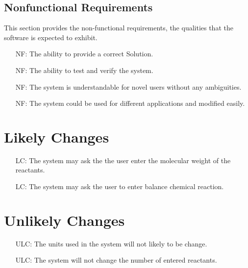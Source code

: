 \documentclass[12pt]{article}
\newcounter{reqnum} %
\newcounter{nfreqnum} %
\newcounter{lcnum} %
\newcounter{ulcnum} %
\begin{document}
\subsection{Nonfunctional Requirements}

This section provides the non-functional requirements, the qualities that the software is
expected to exhibit.\\

\noindent \begin{itemize}
\item[NF\refstepcounter{nfreqnum}\thenfreqnum \label{Accuracy}:] The ability to provide a correct Solution.\\
\item[NF\refstepcounter{nfreqnum}\thenfreqnum \label{Verify}:]  The ability to test and verify the system.\\
\item[NF\refstepcounter{nfreqnum}\thenfreqnum \label{Understandability}:]  The system is understandable for novel users without any ambiguities.\\
\item[NF\refstepcounter{nfreqnum}\thenfreqnum \label{Usability}:]  The system could be used for different applications and modified easily.\\

\end{itemize}

\section{Likely Changes}    

\noindent \begin{itemize}

\item[LC\refstepcounter{lcnum}\thelcnum\label{Molecular weight}:] The system may ask the the user enter the molecular weight of the reactants.
\item[LC\refstepcounter{lcnum}\thelcnum\label{balance}:] The system may ask the user to enter balance chemical reaction.



\end{itemize}

\section{Unlikely Changes}    

\noindent \begin{itemize}

\item[ULC\refstepcounter{ulcnum}\theulcnum\label{Units}:] The units used in the system will not likely to be change.
\item[ULC\refstepcounter{ulcnum}\theulcnum\label{reactant}:] The system will not change the number of entered reactants. 

\end{itemize}
\end{document}
